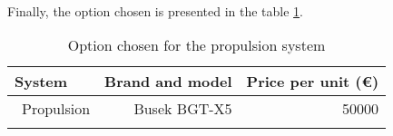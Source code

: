 \paragraph{}Finally, the option chosen is presented in the table \ref{propulsionfinal}.

\begin{longtable}{| l | r | r | }
\hline
\rowcolor[gray]{0.80}	\textbf{System} &  \textbf{Brand and model}     & \textbf{Price per unit (\euro)}   \\
\hline
\endfirsthead

	   ~Propulsion & Busek BGT-X5 & 50000 \\
	\hline

\caption{Option chosen for the propulsion system}
\label{propulsionfinal}
\end{longtable}
